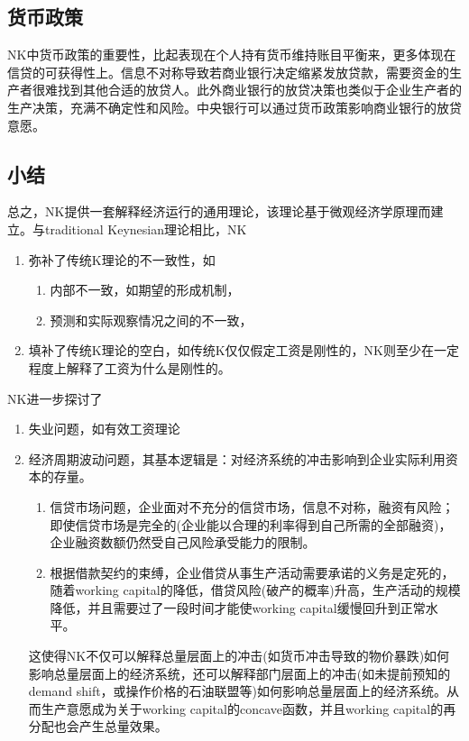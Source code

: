 \subsection{货币政策}
\label{sec:KNK-NK-monetary-policy}
NK中货币政策的重要性，比起表现在个人持有货币维持账目平衡来，更多体现在信贷的可获得性上。信息不对称导致若商业银行决定缩紧发放贷款，需要资金的生产者很难找到其他合适的放贷人。此外商业银行的放贷决策也类似于企业生产者的生产决策，充满不确定性和风险。中央银行可以通过货币政策影响商业银行的放贷意愿。

\subsection{小结}
\label{sec:KNK-NK-pros}
总之，NK提供一套解释经济运行的通用理论，该理论基于微观经济学原理而建立。与traditional Keynesian理论相比，NK
\begin{enumerate}
\item 弥补了传统K理论的不一致性，如
\begin{enumerate}
\item 内部不一致，如期望的形成机制，
\item 预测和实际观察情况之间的不一致，
\end{enumerate}
\item 填补了传统K理论的空白，如传统K仅仅假定工资是刚性的，NK则至少在一定程度上解释了工资为什么是刚性的。
\end{enumerate}

NK进一步探讨了
\begin{enumerate}
\item 失业问题，如有效工资理论
\item 经济周期波动问题，其基本逻辑是：对经济系统的冲击影响到企业实际利用资本的存量。
\begin{enumerate}
\item 信贷市场问题，企业面对不充分的信贷市场，信息不对称，融资有风险；即使信贷市场是完全的(企业能以合理的利率得到自己所需的全部融资)，企业融资数额仍然受自己风险承受能力的限制。
\item 根据借款契约的束缚，企业借贷从事生产活动需要承诺的义务是定死的，随着working capital的降低，借贷风险(破产的概率)升高，生产活动的规模降低，并且需要过了一段时间才能使working capital缓慢回升到正常水平。
\end{enumerate}

这使得NK不仅可以解释总量层面上的冲击(如货币冲击导致的物价暴跌)如何影响总量层面上的经济系统，还可以解释部门层面上的冲击(如未提前预知的demand shift，或操作价格的石油联盟等)如何影响总量层面上的经济系统。从而生产意愿成为关于working capital的concave函数，并且working capital的再分配也会产生总量效果。
\end{enumerate}

